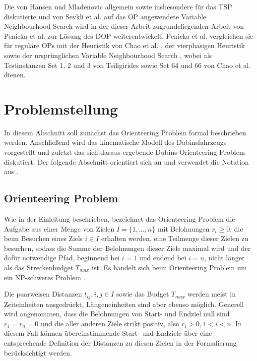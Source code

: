 \documentclass[12pt,a4paper,twoside]{article}
\theoremstyle{definition}
\numberwithin{equation}{section}
\begin{document}
Die von Hansen und Mladenovic \cite{Hansen.2001} allgemein sowie insbesondere für das TSP diskutierte und von Sevkli et al. \cite{Sevkli.2006} auf das OP angewendete Variable Neighbourhood Search wird in der dieser Arbeit zugrundeliegenden Arbeit von Penicka et al. \cite{R.Penicka.2017} zur Lösung des DOP weiterentwickelt. Penicka et al. \cite{R.Penicka.2017} vergleichen sie für reguläre OPs mit der Heuristik von Chao et al. \cite{Chao.1996b}, der vierphasigen Heuristik \cite{Ramesh.1991} sowie der ursprünglichen Variable Neighbourhood Search \cite{Sevkli.2006}, wobei als Testinstanzen Set 1, 2 und 3 von Tsiligirides \cite{Tsiligirides.1984} sowie Set 64 und 66 von Chao et al. \cite{Chao.1996b} dienen.

\newpage

\section{Problemstellung}\label{section:problem}
In diesem Abschnitt soll zunächst das Orienteering Problem formal beschrieben werden. Anschließend wird das kinematische Modell des Dubinsfahrzeugs vorgestellt und zuletzt das sich daraus ergebende Dubins Orienteering Problem diskutiert.
Der folgende Abschnitt orientiert sich an \cite{Vansteenwegen.2019} und verwendet die Notation aus \cite{R.Penicka.2017}.

\subsection{Orienteering Problem}\label{subsection:OP}

Wie in der Einleitung beschrieben, bezeichnet das Orienteering Problem die Aufgabe aus einer Menge von Zielen $I = \{1,...,n\}$  mit Belohnungen $r_i \geq 0$, die beim Besuchen eines Ziels $i \in I$ erhalten werden, eine Teilmenge dieser Zielen zu besuchen, sodass die Summe der Belohnungen dieser Ziele maximal wird und der dafür notwendige Pfad, beginnend bei $i = 1$ und endend bei $ i = n$, nicht länger als das Streckenbudget $T_{max}$ ist.
Es handelt sich beim Orienteering Problem um ein NP-schweres Problem \cite{Vansteenwegen.2019}.

Die paarweisen Distanzen $t_{ij}, i,j\in I$ sowie das Budget $T_{max}$ werden meist in Zeiteinheiten ausgedrückt, Längeneinheiten sind aber ebenso möglich. Generell wird angenommen, dass die Belohnungen von Start- und Endziel null sind $r_1 = r_n = 0$ und die aller anderen Ziele strikt positiv, also $r_i > 0, 1 < i < n$. In diesem Fall können übereinstimmende Start- und Endziele über eine entsprechende Definition der Distanzen zu diesen Zielen in der Formulierung berücksichtigt werden.
\end{document}
